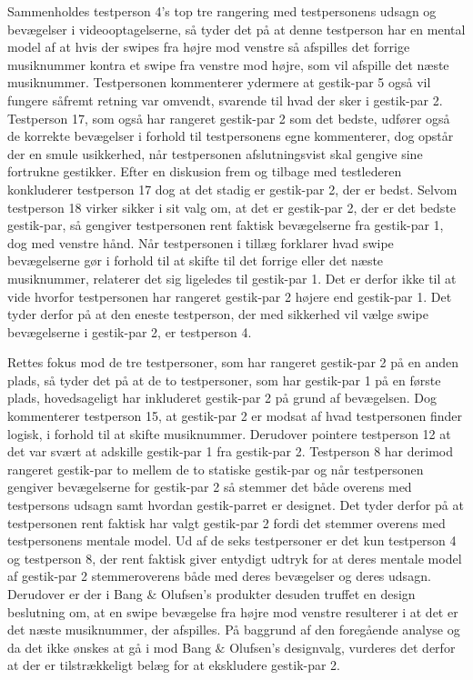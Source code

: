 Sammenholdes testperson 4's top tre rangering med testpersonens udsagn og bevægelser i videooptagelserne, så tyder det på at denne testperson har en mental model af at hvis der swipes fra højre mod venstre så afspilles det forrige musiknummer kontra et swipe fra venstre mod højre, som vil afspille det næste musiknummer. Testpersonen kommenterer ydermere at gestik-par 5 også vil fungere såfremt retning var omvendt, svarende til hvad der sker i gestik-par 2. Testperson 17, som også har rangeret gestik-par 2 som det bedste, udfører også de korrekte bevægelser i forhold til testpersonens egne kommenterer, dog opstår der en smule usikkerhed, når testpersonen afslutningsvist skal gengive sine fortrukne gestikker. Efter en diskusion frem og tilbage med testlederen konkluderer testperson 17 dog at det stadig er gestik-par 2, der er bedst. Selvom testperson 18 virker sikker i sit valg om, at det er gestik-par 2, der er det bedste gestik-par, så gengiver testpersonen rent faktisk bevægelserne fra gestik-par 1, dog med venstre hånd. Når testpersonen i tillæg forklarer hvad swipe bevægelserne gør i forhold til at skifte til det forrige eller det næste musiknummer, relaterer det sig ligeledes til gestik-par 1. Det er derfor ikke til at vide hvorfor testpersonen har rangeret gestik-par 2 højere end gestik-par 1. Det tyder derfor på at den eneste testperson, der med sikkerhed vil vælge swipe bevægelserne i gestik-par 2, er testperson 4. 

Rettes fokus mod de tre testpersoner, som har rangeret gestik-par 2 på en anden plads, så tyder det på at de to testpersoner, som har gestik-par 1 på en første plads, hovedsageligt har inkluderet gestik-par 2 på grund af bevægelsen. Dog kommenterer testperson 15, at gestik-par 2 er modsat af hvad testpersonen finder logisk, i forhold til at skifte musiknummer.  Derudover pointere testperson 12 at det var svært at adskille gestik-par 1 fra gestik-par 2. Testperson 8 har derimod rangeret gestik-par to mellem de to statiske gestik-par og når testpersonen gengiver bevægelserne for gestik-par 2 så stemmer det både overens med testpersons udsagn samt hvordan gestik-parret er designet. Det tyder derfor på at testpersonen rent faktisk har valgt gestik-par 2 fordi det stemmer overens med testpersonens mentale model.\blankline 
%
Ud af de seks testpersoner er det kun testperson 4 og testperson 8, der rent faktisk giver entydigt udtryk for at deres mentale model af gestik-par 2 stemmeroverens både med deres bevægelser og deres udsagn. Derudover er der i Bang $\&$ Olufsen's produkter desuden truffet en design beslutning om, at en swipe bevægelse fra højre mod venstre resulterer i at det er det næste musiknummer, der afspilles. På baggrund af den foregående analyse og da det ikke ønskes at gå i mod Bang $\&$ Olufsen's designvalg, vurderes det derfor at der er tilstrækkeligt belæg for at ekskludere gestik-par 2. 

